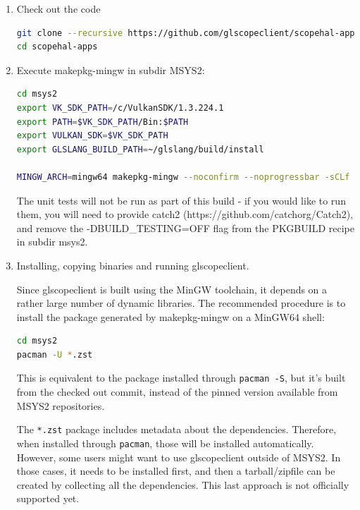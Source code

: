 \begin{enumerate}
\item Check out the code

\begin{lstlisting}[language=sh, numbers=none]
git clone --recursive https://github.com/glscopeclient/scopehal-apps
cd scopehal-apps
\end{lstlisting}

\item Execute makepkg-mingw in subdir MSYS2:

\begin{lstlisting}[language=sh, numbers=none]
cd msys2
export VK_SDK_PATH=/c/VulkanSDK/1.3.224.1
export PATH=$VK_SDK_PATH/Bin:$PATH
export VULKAN_SDK=$VK_SDK_PATH
export GLSLANG_BUILD_PATH=~/glslang/build/install

MINGW_ARCH=mingw64 makepkg-mingw --noconfirm --noprogressbar -sCLf
\end{lstlisting}

The unit tests will not be run as part of this build - if you would like to run them, you will need to provide catch2
(https://github.com/catchorg/Catch2), and remove the -DBUILD\_TESTING=OFF flag from the PKGBUILD recipe in subdir
msys2.

\item Installing, copying binaries and running glscopeclient.

Since glscopeclient is built using the MinGW toolchain, it depends on a rather large number of dynamic libraries.
The recommended procedure is to install the package generated by makepkg-mingw on a MinGW64 shell:

\begin{lstlisting}[language=sh, numbers=none]
cd msys2
pacman -U *.zst
\end{lstlisting}

This is equivalent to the package installed through \lstinline{pacman -S}, but it's built from the checked out commit,
instead of the pinned version available from MSYS2 repositories.

The \lstinline{*.zst} package includes metadata about the dependencies.
Therefore, when installed through \lstinline{pacman}, those will be installed automatically.
However, some users might want to use glscopeclient outside of MSYS2.
In those cases, it needs to be installed first, and then a tarball/zipfile can be created by collecting all the dependencies.
This last approach is not officially supported yet.

\end{enumerate}

